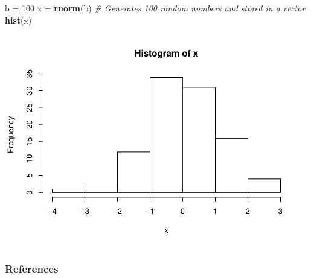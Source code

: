 \documentclass[]{article}
\newenvironment{Shaded}{\begin{snugshade}}{\end{snugshade}}
\newcommand{\KeywordTok}[1]{\textcolor[rgb]{0.13,0.29,0.53}{\textbf{#1}}}
\newcommand{\DecValTok}[1]{\textcolor[rgb]{0.00,0.00,0.81}{#1}}
\newcommand{\StringTok}[1]{\textcolor[rgb]{0.31,0.60,0.02}{#1}}
\newcommand{\CommentTok}[1]{\textcolor[rgb]{0.56,0.35,0.01}{\textit{#1}}}
\newcommand{\NormalTok}[1]{#1}
\begin{document}
\begin{Shaded}
\begin{Highlighting}[]
\NormalTok{b =}\StringTok{ }\DecValTok{100}
\NormalTok{x =}\StringTok{ }\KeywordTok{rnorm}\NormalTok{(b) }\CommentTok{# Generates 100 random numbers and stored in a vector}
\KeywordTok{hist}\NormalTok{(x)}
\end{Highlighting}
\end{Shaded}

\includegraphics{HW1_files/figure-latex/hist-1.pdf}

\subsubsection{References}\label{references}
\end{document}
